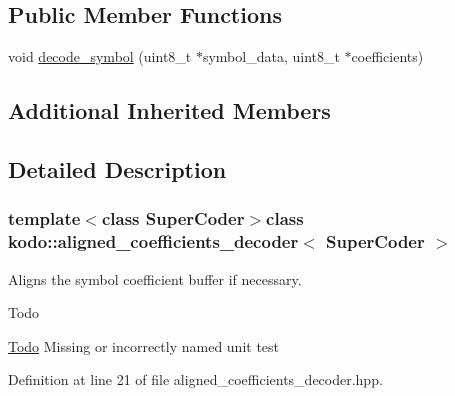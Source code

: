 \subsection*{Public Member Functions}
\begin{DoxyCompactItemize}
\item 
void \hyperlink{classkodo_1_1aligned__coefficients__decoder_a59cb08dca9d926d061feb55516588d36}{decode\-\_\-symbol} (uint8\-\_\-t $\ast$symbol\-\_\-data, uint8\-\_\-t $\ast$coefficients)
\begin{DoxyCompactList}\small\item\em \end{DoxyCompactList}\end{DoxyCompactItemize}
\subsection*{Additional Inherited Members}


\subsection{Detailed Description}
\subsubsection*{template$<$class Super\-Coder$>$class kodo\-::aligned\-\_\-coefficients\-\_\-decoder$<$ Super\-Coder $>$}

Aligns the symbol coefficient buffer if necessary. 

\begin{DoxyRefDesc}{Todo}
\item[\hyperlink{todo__todo000002}{Todo}]Missing or incorrectly named unit test\end{DoxyRefDesc}


Definition at line 21 of file aligned\-\_\-coefficients\-\_\-decoder.\-hpp.



